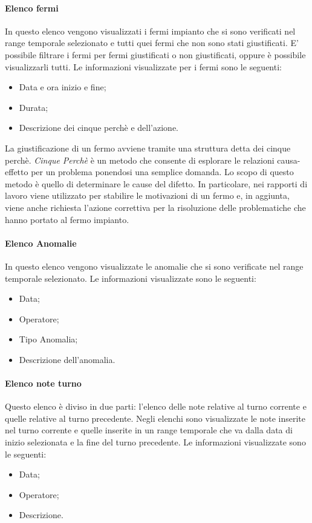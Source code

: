   \paragraph{Elenco fermi}
  In questo elenco vengono visualizzati i fermi impianto che si sono verificati nel range temporale selezionato 
  e tutti quei fermi che non sono stati giustificati. E' possibile filtrare i fermi per fermi giustificati 
  o non giustificati, oppure è possibile visualizzarli tutti. Le informazioni visualizzate per i fermi 
  sono le seguenti:
  \begin{itemize}
    \item Data e ora inizio e fine;
    \item Durata;
    \item Descrizione dei cinque perchè e dell’azione.
  \end{itemize}
  La giustificazione di un fermo avviene tramite una struttura detta dei cinque perchè. 
  \textit{Cinque Perchè} è un metodo che consente di esplorare le relazioni causa-effetto per un problema ponendosi una 
  semplice domanda. Lo scopo di questo metodo è quello di determinare le cause del difetto. In particolare, nei 
  rapporti di lavoro viene utilizzato per stabilire le motivazioni di un fermo e, in aggiunta, viene anche richiesta 
  l'azione correttiva per la risoluzione delle problematiche che hanno portato al fermo impianto.

  \paragraph{Elenco Anomalie}
  In questo elenco vengono visualizzate le anomalie che si sono verificate nel range temporale selezionato.
  Le informazioni visualizzate sono le seguenti:
  \begin{itemize}
    \item Data;
    \item Operatore;
    \item Tipo Anomalia;
    \item Descrizione dell'anomalia.
  \end{itemize} 
  
  \paragraph{Elenco note turno}
  Questo elenco è diviso in due parti: l'elenco delle note relative al turno corrente e quelle relative al 
  turno precedente. Negli elenchi sono visualizzate le note inserite nel turno corrente e quelle inserite 
  in un range temporale che va dalla data di inizio selezionata e la fine del turno precedente. 
  Le informazioni visualizzate sono le seguenti:
  \begin{itemize}
    \item Data;
    \item Operatore;
    \item Descrizione.
  \end{itemize}   

